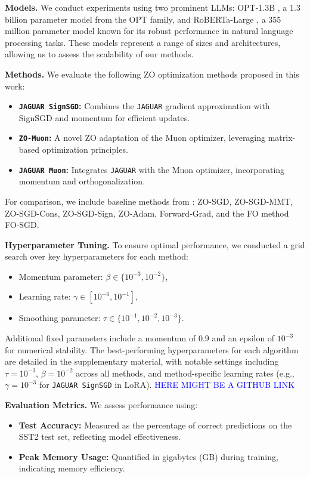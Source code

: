 \documentclass{article}
\theoremstyle{plain}
\theoremstyle{definition}
\theoremstyle{remark}
\begin{document}
\textbf{Models.} We conduct experiments using two prominent LLMs: OPT-1.3B \cite{zhang2022opt}, a 1.3 billion parameter model from the OPT family, and RoBERTa-Large \cite{liu2019roberta}, a 355 million parameter model known for its robust performance in natural language processing tasks. These models represent a range of sizes and architectures, allowing us to assess the scalability of our methods.

\textbf{Methods.} We evaluate the following ZO optimization methods proposed in this work:
\begin{itemize}
    \item \textbf{\texttt{JAGUAR SignSGD}:} Combines the \texttt{JAGUAR} gradient approximation \cite{veprikov2024new} with SignSGD and momentum for efficient updates.
    \item \textbf{\texttt{ZO-Muon}:} A novel ZO adaptation of the Muon optimizer, leveraging matrix-based optimization principles.
    \item \textbf{\texttt{JAGUAR Muon}:} Integrates \texttt{JAGUAR} with the Muon optimizer, incorporating momentum and orthogonalization.
\end{itemize}
For comparison, we include baseline methods from \cite{zo_bench}: ZO-SGD, ZO-SGD-MMT, ZO-SGD-Cons, ZO-SGD-Sign, ZO-Adam, Forward-Grad, and the FO method FO-SGD.

\textbf{Hyperparameter Tuning.} To ensure optimal performance, we conducted a grid search over key hyperparameters for each method:
\begin{itemize}
    \item Momentum parameter: $\beta \in \{10^{-3}, 10^{-2}\}$,
    \item Learning rate: $\gamma \in [10^{-6}, 10^{-1}]$,
    \item Smoothing parameter: $\tau \in \{10^{-1}, 10^{-2}, 10^{-3}\}$.
\end{itemize}
Additional fixed parameters include a momentum of 0.9 and an epsilon of $10^{-3}$ for numerical stability. The best-performing hyperparameters for each algorithm are detailed in the supplementary material, with notable settings including $\tau = 10^{-3}$, $\beta = 10^{-2}$ across all methods, and method-specific learning rates (e.g., $\gamma = 10^{-3}$ for \texttt{JAGUAR SignSGD} in LoRA). \textcolor{blue}{HERE MIGHT BE A GITHUB LINK}

\textbf{Evaluation Metrics.} We assess performance using:
\begin{itemize}
    \item \textbf{Test Accuracy:} Measured as the percentage of correct predictions on the SST2 test set, reflecting model effectiveness.
    \item \textbf{Peak Memory Usage:} Quantified in gigabytes (GB) during training, indicating memory efficiency.
\end{itemize}
\end{document}
